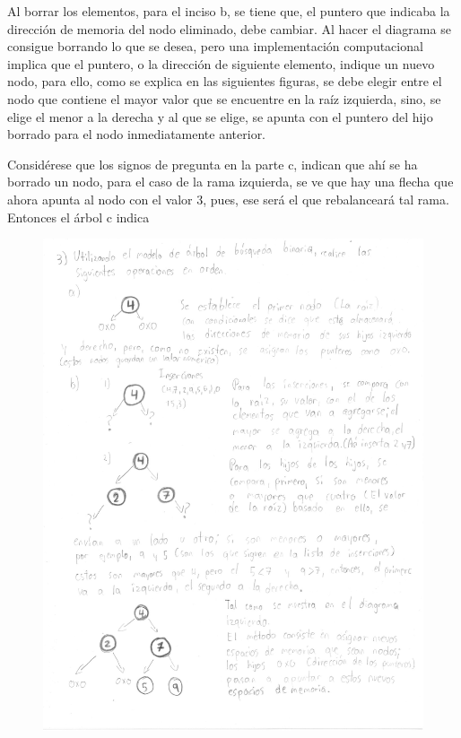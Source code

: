 \documentclass[11pt]{article}
\begin{document}
Al borrar los elementos, para el inciso b, se tiene que, el puntero que indicaba la dirección de memoria del nodo eliminado, debe cambiar. Al hacer el diagrama se consigue borrando lo que se desea, pero una implementación computacional implica que el puntero, o la dirección de siguiente elemento, indique un nuevo nodo, para ello, como se explica en las siguientes figuras, se debe elegir entre el nodo que contiene el mayor valor que se encuentre en la raíz izquierda, sino, se elige el menor a la derecha y al que se elige, se apunta con el puntero del hijo borrado para el nodo inmediatamente anterior. 

Considérese que los signos de pregunta en la parte c, indican que ahí se ha borrado un nodo, para el caso de la rama izquierda, se ve que hay una flecha que ahora apunta al nodo con el valor 3, pues, ese será el que rebalanceará tal rama. Entonces el árbol c indica

\newpage
\begin{figure}[H]
\includegraphics[width=18.5cm]{foto1.jpg}
\centering
\end{figure}
\end{document}
